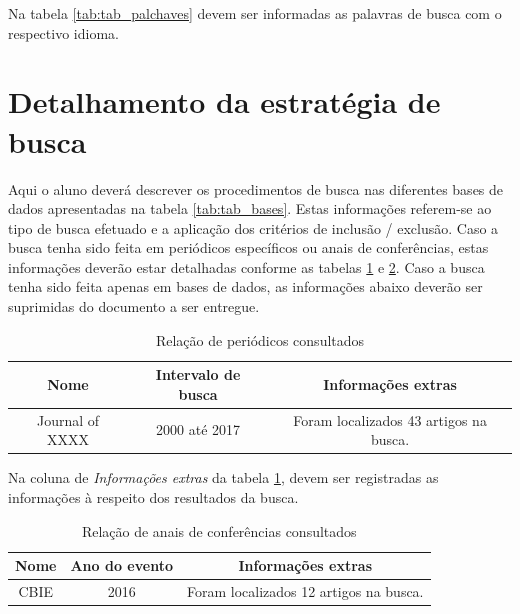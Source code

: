 \documentclass[a4paper,11pt]{article}
\begin{document}
Na tabela \ref{tab:tab_palchaves} devem ser informadas as palavras de busca com o respectivo idioma. 
 
\section{Detalhamento da estratégia de busca}
 Aqui o aluno deverá descrever os procedimentos de busca nas diferentes bases de dados apresentadas na tabela \ref{tab:tab_bases}. Estas informações referem-se  ao tipo de busca efetuado e a aplicação dos critérios de inclusão / exclusão. Caso a busca tenha sido feita em periódicos específicos ou anais de conferências, estas informações deverão estar detalhadas conforme as tabelas \ref{tab:tab_periodico} e  \ref{tab:tab_conf}. Caso a busca tenha sido feita apenas em bases de dados, as informações abaixo deverão ser suprimidas do documento a ser entregue.
 
\begin{table}[ht]
\begin{tabular}{|c | c | c |}
\hline
\textbf{Nome} & \textbf{Intervalo de busca} & \textbf{Informações extras} \\
\hline
Journal of XXXX & 2000 até 2017 & Foram localizados 43 artigos na busca. \\
\hline
\end{tabular}
\caption{Relação de periódicos consultados}
\label{tab:tab_periodico}
\end{table}

Na coluna de \emph{Informações extras} da tabela \ref{tab:tab_periodico}, devem ser registradas as informações à respeito dos resultados da busca. 

\begin{table}[ht]
\begin{tabular}{|c | c | c |}
\hline
\textbf{Nome} & \textbf{Ano do evento} & \textbf{Informações extras} \\
\hline
CBIE & 2016 & Foram localizados 12 artigos na busca. \\
\hline
\end{tabular}
\caption{Relação de anais de conferências consultados}
\label{tab:tab_conf}
\end{table}



\end{document}
